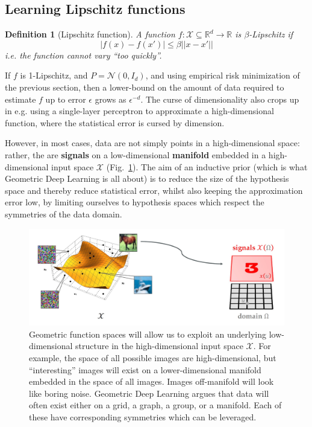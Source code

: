 \documentclass[11pt]{article}
\numberwithin{equation}{section}
\newtheorem{defn}{Definition}[section]
\begin{document}
\subsection{Learning Lipschitz functions}
\begin{defn}[Lipschitz function]
A function $f: \mathcal{X} \subseteq \mathbb{R}^d \rightarrow \mathbb{R}$ is $\beta$-Lipschitz if 
\begin{equation}
|f(x)-f(x')| \leq \beta ||x-x'||
\end{equation}
i.e. the function cannot vary ``too quickly''. 
\end{defn}
If $f$ is 1-Lipschitz, and $P=\mathcal{N}(0, I_d)$, and using empirical risk minimization of the previous section, then a lower-bound on the amount of data required to estimate $f$ up to error $\epsilon$ grows as $\epsilon^{-d}$. The curse of dimensionality also crops up in e.g. using a single-layer perceptron to approximate a high-dimensional function, where the statistical error is cursed by dimension. 

However, in most cases, data are not simply points in a high-dimensional space: rather, the are \textbf{signals} on a low-dimensional \textbf{manifold} embedded in a high-dimensional input space $\mathcal{X}$ (Fig.~\ref{fig:geom-func-spaces}). The aim of an inductive prior (which is what Geometric Deep Learning is all about) is to reduce the size of the hypothesis space and thereby reduce statistical error, whilst also keeping the approximation error low, by limiting ourselves to hypothesis spaces which respect the symmetries of the data domain.

\begin{figure}
\begin{center}
\includegraphics[width=0.8\columnwidth]{../figures/geometric-function-spaces.jpg}  
\end{center}
\caption{Geometric function spaces will allow us to exploit an underlying low-dimensional structure in the high-dimensional input space $\mathcal{X}$. For example, the space of all possible images are high-dimensional, but ``interesting'' images will exist on a lower-dimensional manifold embedded in the space of all images. Images off-manifold will look like boring noise. Geometric Deep Learning argues that data will often exist either on a grid, a graph, a group, or a manifold. Each of these have corresponding symmetries which can be leveraged.
}
\label{fig:geom-func-spaces}
\end{figure}
\end{document}
